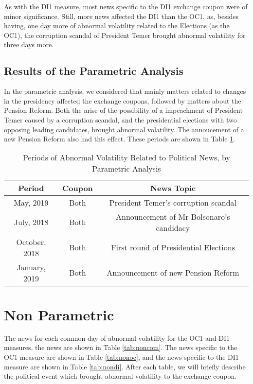 \documentclass[cic,tc, english]{iiufrgs}
\begin{document}
    
    
    As with the DI1 measure, most news specific to the DI1 exchange coupon were of minor significance. Still, more news affected the DI1 than the OC1, as, besides having, one day more of abnormal volatility related to the Elections (as the OC1), the corruption scandal of President Temer brought abnormal volatility for three days more.
    
\subsection{Results of the Parametric Analysis}
    
    In the parametric analysis, we considered that mainly matters related to changes in the presidency affected the exchange coupons, followed by matters about the Pension Reform. Both the arise of the possibility of a impeachment of President Temer caused by a corruption scandal, and the presidential elections with two opposing leading candidates, brought abnormal volatility. The annoucement of a new Pension Reform also had this effect. These periods are shown in Table \ref{tab:respar}.

    \begin{table}[H]
        \caption{Periods of Abnormal Volatility Related to Political News, by Parametric Analysis}
        \label{tab:respar}
        \centering
        \begin{tabular}{ | c | c | c | }
            \hline
            Period & Coupon & News Topic \\
            \hline \hline
            May, 2019 & Both & President Temer's corruption scandal \\
            \hline
            July, 2018 & Both & Announcement of Mr Bolsonaro's candidacy \\
            \hline
            October, 2018 & Both & First round of Presidential Elections \\
            \hline
            January, 2019 & Both & Announcement of new Pension Reform \\
            \hline
        \end{tabular}
    \end{table}

\section{Non Parametric}

    The news for each common day of abnormal volatility for the OC1 and DI1 measures, the news are shown in Table \ref{tab:noncom}. The news specific to the OC1 measure are shown in Table \ref{tab:nonoc}, and the news specific to the DI1 measure are shown in Table \ref{tab:nondi}. After each table, we will briefly describe the political event which brought abnormal volatility to the exchange coupon.
   
\end{document}
